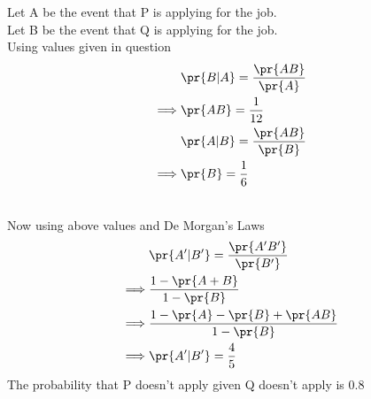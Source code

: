 
Let A be the event that P is applying for the job.\\
Let B be the event that Q is applying for the job.\\
Using values given in question
\begin{align}
    &\pr{B|A}=\frac{\pr{AB}}{\pr{A}}\\
    \implies& \pr{AB}=\frac{1}{12}\\
    &\pr{A|B}=\frac{\pr{AB}}{\pr{B}}\\
    \implies& \pr{B}=\frac{1}{6}
\end{align}
\begin{table}[ht]
\caption{Probability for random variables}
\centering
{}
\end{table}
\\
Now using above values and De Morgan's Laws
\begin{align}
    &\pr{A'|B'}=\frac{\pr{A'B'}}{\pr{B'}}\\
    \implies& \frac{1-\pr{A + B}}{1-\pr{B}}\\
    \implies& \frac{1-\pr{A}-\pr{B}+\pr{AB}}{1-\pr{B}}\\
    \implies& \pr{A'|B'}=\frac{4}{5} 
\end{align}
The probability that P doesn't apply given Q doesn't apply is 0.8